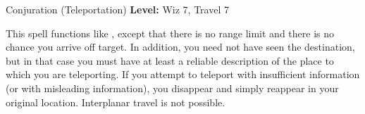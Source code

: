 {Conjuration (Teleportation)}
{
	\textbf{Level:}
	Wiz 7, Travel 7\\
}
{
	This spell functions like , except that there is no range limit and there is no chance you arrive off target. In addition, you need not have seen the destination, but in that case you must have at least a reliable description of the place to which you are teleporting. If you attempt to teleport with insufficient information (or with misleading information), you disappear and simply reappear in your original location. Interplanar travel is not possible.

}
